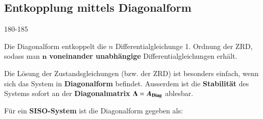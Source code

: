 \subsection{Entkopplung mittels Diagonalform}{180-185}

Die Diagonalform entkoppelt die $n$ Differentialgleichunge 1. Ordnung der ZRD, sodass man $\bm{n}$ \textbf{voneinander unabhängige} Differentialgleichungen erhält.

\smallskip

Die Lösung der Zustandsgleichungen (bzw. der ZRD) ist besonders einfach, wenn sich das System in \textbf{Diagonalform} befindet.
Ausserdem ist die \textbf{Stabilität} des Systems sofort an der \textbf{Diagonalmatrix} $\bm{\Lambda} = \bm{A_{\rm Diag}}$ ablesbar.

\smallskip

Für ein \textbf{SISO-System} ist die Diagonalform gegeben als:


